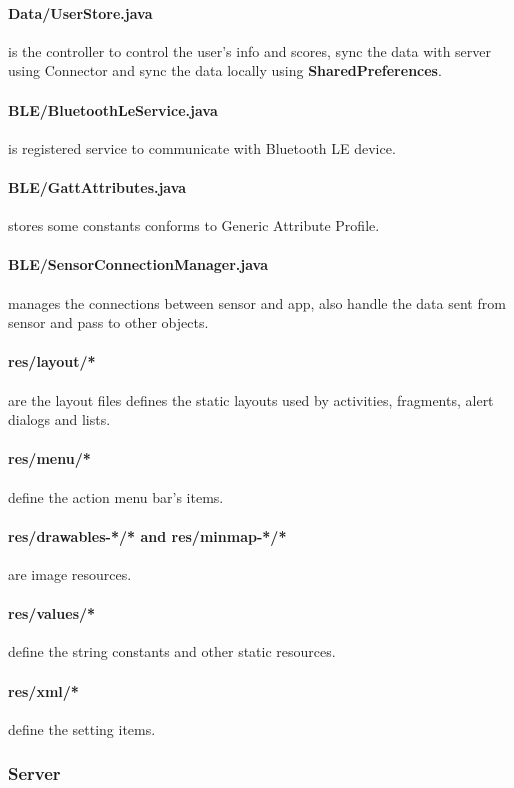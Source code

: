 \paragraph{Data/UserStore.java} is the controller to control the user's info and scores, sync the data with server using Connector and sync the data locally using {\bf SharedPreferences}.
\paragraph{BLE/BluetoothLeService.java} is registered service to communicate with Bluetooth LE device.
\paragraph{BLE/GattAttributes.java} stores some constants conforms to Generic Attribute Profile.
\paragraph{BLE/SensorConnectionManager.java} manages the connections between sensor and app, also handle the data sent from sensor and pass to other objects.


\paragraph{res/layout/*} are the layout files defines the static layouts used by activities, fragments, alert dialogs and lists.
\paragraph{res/menu/*} define the action menu bar's items.
\paragraph{res/drawables-*/* and res/minmap-*/*} are image resources.
\paragraph{res/values/*} define the string constants and other static resources.
\paragraph{res/xml/*} define the setting items.





\subsubsection{Server}

